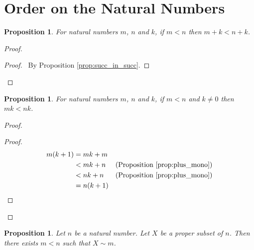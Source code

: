 \documentclass{report}
\let\qed\relax
\newtheorem{prop}[ax]{Proposition}
\theoremstyle{definition}
\begin{document}
\section{Order on the Natural Numbers}

\begin{prop}
\label{prop:plus_mono}
For natural numbers $m$, $n$ and $k$, if $m < n$ then $m + k < n + k$.
\end{prop}

\begin{proof}
\pf
{}
\begin{proof}
	\pf\ By Proposition \ref{prop:succ_in_succ}.
\end{proof}
\qed
\end{proof}

\begin{prop}
For natural numbers $m$, $n$ and $k$, if $m < n$ and $k \neq 0$ then $mk < nk$.
\end{prop}

\begin{proof}
\pf
{}
\begin{proof}
	\pf
	\begin{align*}
		m(k+1) & = mk + m \\
		& < mk + n & (\text{Proposition \ref{prop:plus_mono}}) \\
		& < nk + n & (\text{Proposition \ref{prop:plus_mono}}) \\
		& = n(k+1)
	\end{align*}
\end{proof}
\qed
\end{proof}

\begin{prop}
\label{prop:subset_finite}
Let $n$ be a natural number. Let $X$ be a proper subset of $n$. Then there exists $m < n$ such that $X \sim m$.
\end{prop}
\end{document}
